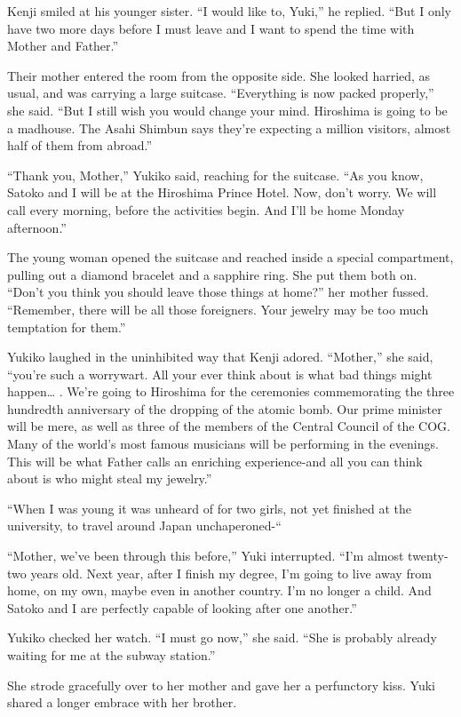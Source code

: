 \documentclass[]{article}
\begin{document}
{Kenji smiled at his younger sister. “I would like to, Yuki,” he replied. “But I only have two more days before I must leave and I want to spend the time with Mother and Father.”

Their mother entered the room from the opposite side. She looked harried, as usual, and was carrying a large suitcase. “Everything is now packed properly,” she said. “But I still wish you would change your mind. Hiroshima is going to be a madhouse. The Asahi Shimbun says they’re expecting a million visitors, almost half of them from abroad.”

“Thank you, Mother,” Yukiko said, reaching for the suitcase. “As you know, Satoko and I will be at the Hiroshima Prince Hotel. Now, don’t worry. We will call every morning, before the activities begin. And I’ll be home Monday afternoon.”

The young woman opened the suitcase and reached inside a special compartment, pulling out a diamond bracelet and a sapphire ring. She put them both on. “Don’t you think you should leave those things at home?” her mother fussed. “Remember, there will be all those foreigners. Your jewelry may be too much temptation for them.”

Yukiko laughed in the uninhibited way that Kenji adored. “Mother,” she said, “you’re such a worrywart. All your ever think about is what bad things might happen… . We’re going to Hiroshima for the ceremonies commemorating the three hundredth anniversary of the dropping of the atomic bomb. Our prime minister will be mere, as well as three of the members of the Central Council of the COG. Many of the world’s most famous musicians will be performing in the evenings. This will be what Father calls an enriching experience-and all you can think about is who might steal my jewelry.”

“When I was young it was unheard of for two girls, not yet finished at the university, to travel around Japan unchaperoned-“

“Mother, we’ve been through this before,” Yuki interrupted. “I’m almost twenty-two years old. Next year, after I finish my degree, I’m going to live away from home, on my own, maybe even in another country. I’m no longer a child. And Satoko and I are perfectly capable of looking after one another.”

Yukiko checked her watch. “I must go now,” she said. “She is probably already waiting for me at the subway station.”

She strode gracefully over to her mother and gave her a perfunctory kiss. Yuki shared a longer embrace with her brother.

}
\end{document}
